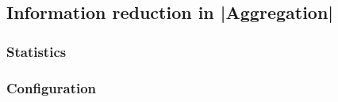 

\subsection{Information reduction in |Aggregation|}\label{sec:aggregation}

\subsubsection{Statistics}

\subsubsection{Configuration}
